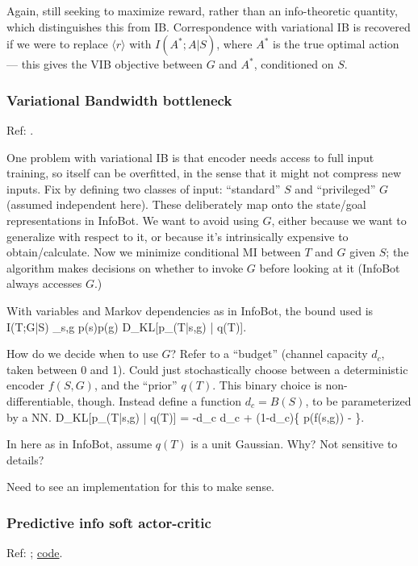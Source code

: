 \documentclass[notitlepage,openany,11pt]{report}
\theoremstyle{plain}%
\numberwithin{equation}{section}
\begin{document}
Again, still seeking to maximize reward, rather than an info-theoretic quantity, which distinguishes this from IB. Correspondence with variational IB is recovered if we were to replace $\langle r \rangle$ with $I(A^\ast; A|S)$, where $A^\ast$ is the true optimal action --- this gives the VIB objective between $G$ and $A^\ast$, conditioned on $S$. 


\subsubsection{Variational Bandwidth bottleneck} 
Ref: \cite{GoyalEtAl:19a}.

One problem with variational IB is that encoder needs access to full input training, so itself can be overfitted, in the sense that it might not compress new inputs. Fix by defining two classes of input: ``standard'' $S$ and ``privileged'' $G$ (assumed independent here). These deliberately map onto the state/goal representations in InfoBot. We want to avoid using $G$, either because we want to generalize with respect to it, or because it's intrinsically expensive to obtain/calculate. Now we minimize conditional MI between $T$ and $G$ given $S$; the algorithm makes decisions on whether to invoke $G$ before looking at it (InfoBot always accesses $G$.)

With variables and Markov dependencies as in InfoBot, the bound used is
\be
I(T;G|S) \leq \sum_{s,g} p(s)p(g) D_{KL}[p_{}(T|s,g) | q(T)].
\ee

How do we decide when to use $G$? Refer to a ``budget'' (channel capacity $d_c$, taken between 0 and 1). Could just stochastically choose between a deterministic encoder $f(S,G)$, and the ``prior'' $q(T)$. This binary choice is non-differentiable, though. Instead define a function $d_c = B(S)$, to be parameterized by a NN. 
\be
D_{KL}[p_{}(T|s,g) | q(T)] = -d_c \log d_c + (1-d_c)\left\{ \log p(f(s,g)) - \log [d_c p(f(s,g)) + (1-d_c)] \right\}.
\ee

In here as in InfoBot, assume $q(T)$ is a unit Gaussian. Why? Not sensitive to details?

Need to see an implementation for this to make sense.



\subsubsection{Predictive info soft actor-critic}
Ref: \cite{LeeEtAl:20}; \href{https://github.com/google-research/pisac}{code}.
\end{document}
